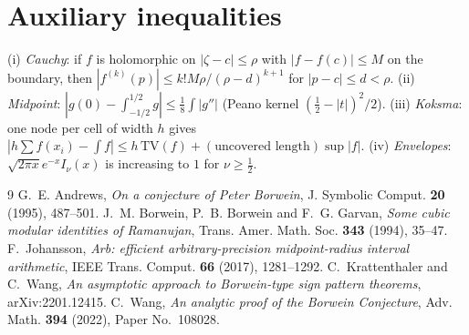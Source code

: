 \documentclass[11pt,reqno]{amsart}
\theoremstyle{plain}
\theoremstyle{definition}
\begin{document}
\section{Auxiliary inequalities}\label{app:aux}
(i) \emph{Cauchy}: if $f$ is holomorphic on $|\zeta-c|\le\rho$ with $|f-f(c)|\le M$ on the boundary, then $|f^{(k)}(p)|\le k!M\rho/(\rho-d)^{k+1}$
for $|p-c|\le d<\rho$. (ii) \emph{Midpoint}: $|g(0)-\int_{-1/2}^{1/2}g|\le\frac18\int|g''|$ (Peano kernel $(\frac12-|t|)^2/2$).
(iii) \emph{Koksma}: one node per cell of width $h$ gives $|h\sum f(x_i)-\int f|\le h\,\mathrm{TV}(f)+(\text{uncovered length})\sup|f|$.
(iv) \emph{Envelopes}: $\sqrt{2\pi x}e^{-x}I_\nu(x)$ is increasing to $1$ for $\nu\ge\frac12$.

\begin{thebibliography}{9}
 G.~E. Andrews, \emph{On a conjecture of Peter Borwein}, J. Symbolic Comput. \textbf{20} (1995), 487--501.
 J.~M. Borwein, P.~B. Borwein and F.~G. Garvan, \emph{Some cubic modular identities of Ramanujan}, Trans. Amer. Math. Soc. \textbf{343} (1994), 35--47.
 F.~Johansson, \emph{Arb: efficient arbitrary-precision midpoint-radius interval arithmetic}, IEEE Trans. Comput. \textbf{66} (2017), 1281--1292.
 C.~Krattenthaler and C.~Wang, \emph{An asymptotic approach to Borwein-type sign pattern theorems}, arXiv:2201.12415.
 C.~Wang, \emph{An analytic proof of the Borwein Conjecture}, Adv. Math. \textbf{394} (2022), Paper No.~108028.
\end{thebibliography}
\end{document}
